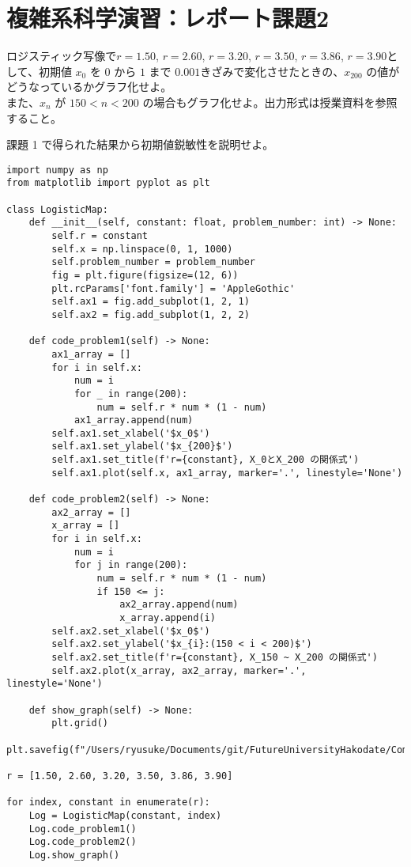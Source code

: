 \documentclass[dvipdfmx,uplatex]{jsarticle}
\begin{document}
\newpage

\section{複雑系科学演習：レポート課題2}

  ロジスティック写像で$r = 1.50$, $r = 2.60$, $r = 3.20$, $r = 3.50$, $r = 3.86$, $r = 3.90$として、初期値 $x_{0}$ を $0$ から $1$ まで $0.001$きざみで変化させたときの、$x_{200}$ の値がどうなっているかグラフ化せよ。\\
また、$x_{n}$ が $150 < n < 200$ の場合もグラフ化せよ。出力形式は授業資料を参照すること。

  課題 1 で得られた結果から初期値鋭敏性を説明せよ。

\begin{lstlisting}[caption=Pythonによるロジスティック写像の描画]
import numpy as np
from matplotlib import pyplot as plt

class LogisticMap:
    def __init__(self, constant: float, problem_number: int) -> None:
        self.r = constant
        self.x = np.linspace(0, 1, 1000)
        self.problem_number = problem_number
        fig = plt.figure(figsize=(12, 6))
        plt.rcParams['font.family'] = 'AppleGothic'
        self.ax1 = fig.add_subplot(1, 2, 1)
        self.ax2 = fig.add_subplot(1, 2, 2)

    def code_problem1(self) -> None:
        ax1_array = []
        for i in self.x:
            num = i
            for _ in range(200):
                num = self.r * num * (1 - num)
            ax1_array.append(num)
        self.ax1.set_xlabel('$x_0$')
        self.ax1.set_ylabel('$x_{200}$')
        self.ax1.set_title(f'r={constant}, X_0とX_200 の関係式')
        self.ax1.plot(self.x, ax1_array, marker='.', linestyle='None')

    def code_problem2(self) -> None:
        ax2_array = []
        x_array = []
        for i in self.x:
            num = i
            for j in range(200):
                num = self.r * num * (1 - num)
                if 150 <= j:
                    ax2_array.append(num)
                    x_array.append(i)
        self.ax2.set_xlabel('$x_0$')
        self.ax2.set_ylabel('$x_{i}:(150 < i < 200)$')
        self.ax2.set_title(f'r={constant}, X_150 ~ X_200 の関係式')
        self.ax2.plot(x_array, ax2_array, marker='.', linestyle='None')

    def show_graph(self) -> None:
        plt.grid()
        plt.savefig(f"/Users/ryusuke/Documents/git/FutureUniversityHakodate/ComplexScienceExercise/result/week02_{self.problem_number}.png")

r = [1.50, 2.60, 3.20, 3.50, 3.86, 3.90]

for index, constant in enumerate(r):
    Log = LogisticMap(constant, index)
    Log.code_problem1()
    Log.code_problem2()
    Log.show_graph()
\end{lstlisting}
\end{document}
